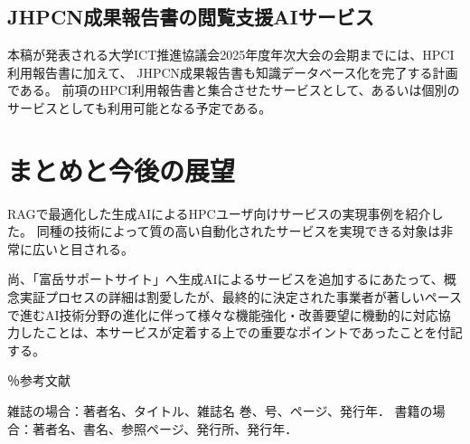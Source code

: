 \documentclass{jsaxiesproc}
\begin{document}
\subsection{JHPCN成果報告書の閲覧支援AIサービス}
本稿が発表される大学ICT推進協議会2025年度年次大会の会期までには、HPCI利用報告書に加えて、
JHPCN成果報告書も知識データベース化を完了する計画である。
前項のHPCI利用報告書と集合させたサービスとして、あるいは個別のサービスとしても利用可能となる予定である。


\section{まとめと今後の展望}
RAGで最適化した生成AIによるHPCユーザ向けサービスの実現事例を紹介した。
同種の技術によって質の高い自動化されたサービスを実現できる対象は非常に広いと目される。

尚、「富岳サポートサイト」へ生成AIによるサービスを追加するにあたって、概念実証プロセスの詳細は割愛したが、最終的に決定された事業者が著しいペースで進むAI技術分野の進化に伴って様々な機能強化・改善要望に機動的に対応協力したことは、本サービスが定着する上での重要なポイントであったことを付記する。


％参考文献
\begin{thebibliography}{99}
	 雑誌の場合：著者名、タイトル、雑誌名 巻、号、ページ、発行年．
	 書籍の場合：著者名、書名、参照ページ、発行所、発行年．
\end{thebibliography}
\end{document}
